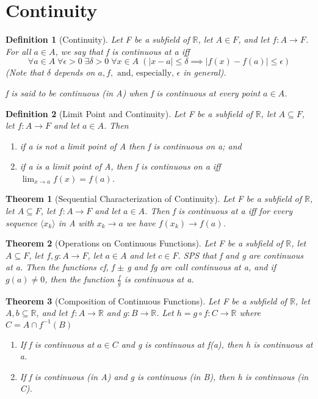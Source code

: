 \documentclass[11pt, oneside]{book}
\theoremstyle{break}
\newtheorem{thm}{Theorem}[section]
\newtheorem{defn}{Definition}[section]
\newcommand{\bb}[1]{\mathbb{#1}}			%
\begin{document}
\section{Continuity}

\begin{defn}[Continuity]
	Let F be a subfield of $\bb{R}$, let $A \in F$, and let $f: A \to F$. For all $a \in A$, we say that f is continuous at a iff
	\[
		\forall a \in A \; \forall \epsilon > 0 \; \exists \delta > 0 \; \forall x \in A \; (|x - a| \leq \delta \implies |f(x) - f(a)| \leq \epsilon)
	\]
	(Note that $\delta$ depends on $a, f, \text{ and, especially, } \epsilon$ in general).

	f is said to be continuous (in A) when f is continuous at every point $a \in A$.
\end{defn}

\begin{defn}[Limit Point and Continuity]
	Let F be a subfield of $\bb{R}$, let $A \subseteq F$, let $f: A \to F$ and let $a \in A$. Then
	\begin{enumerate}
		\item if a is not a limit point of A then f is continuous on a; and
		\item if a is a limit point of A, then f is continuous on a iff $\lim_{x \to a} f(x) = f(a)$.
	\end{enumerate}
\end{defn}

\begin{thm}[Sequential Characterization of Continuity]\label{seq_char_cts}
	Let F be a subfield of $\bb{R}$, let $A \subseteq F$, let $f: A \to F$ and let $a \in A$. Then f is continuous at a iff for every sequence $\langle x_k \rangle$ in A with $x_k \to a$ we have $f(x_k) \to f(a)$.
\end{thm}

\begin{thm}[Operations on Continuous Functions]
	Let F be a subfield of $\bb{R}$, let $A \subseteq F$, let $f, g: A \to F$, let $a \in A$ and let $c \in F$. SPS that f and g are continuous at a. Then the functions cf, f $\pm$ g and fg are call continuous at a, and if $g(a) \neq 0$, then the function $\frac{f}{g}$ is continuous at a.
\end{thm}

\begin{thm}[Composition of Continuous Functions]
	Let F be a subfield of $\bb{R}$, let $A, b \subseteq \bb{R}$, and let $f: A \to \bb{R}$ and $g: B \to \bb{R}$. Let $h = g \circ f : C \to \bb{R}$ where $C = A \cap f^{-1}(B)$
	\begin{enumerate}
		\item If f is continuous at $a \in C$ and g is continuous at f(a), then h is continuous at a.
		\item If f is continuous (in A) and g is continuous (in B), then h is continuous (in C).
	\end{enumerate}
\end{thm}
\end{document}
